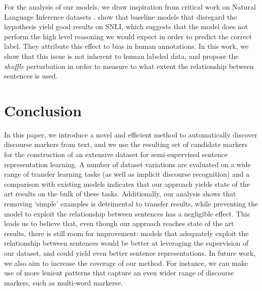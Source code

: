 \documentclass[11pt,a4paper]{article}
\begin{document}
For the analysis of our models, we draw inspiration from critical work on Natural Language Inference datasets \citep{Dasgupta2018, Levy2018}.  
\citet{Gururangan2018,Poliak2018} show that baseline models that disregard the hypothesis yield good results on SNLI, which suggests that the model does not perform the high level reasoning we would expect in order to predict the correct label. They attribute this effect to bias in human annotations. In this work, we show that this issue is not inherent to human labeled data, and propose the \textit{shuffle} perturbation in order to measure to what extent the relationship between sentences is used.


\section{Conclusion}
In this paper, we introduce a novel and efficient method to automatically discover discourse markers from text, and we use the resulting set of candidate markers for the construction of an extensive dataset for semi-supervised sentence representation learning. A number of dataset variations are evaluated on a wide range of transfer learning tasks (as well as implicit discourse recognition) and a comparison with existing models indicates that our approach yields state of the art results on the bulk of these tasks. Additionally, our analysis shows that removing `simple' examples is detrimental to transfer results, while preventing the model to exploit the relationship between sentences has a negligible effect. This leads us to believe that, even though our approach reaches state of the art results, there is still room for improvement: models that adequately exploit the relationship between sentences would be better at leveraging the supervision of our dataset, and could yield even better sentence representations.
In future work, we also aim to increase the coverage of our method. For instance, we can make use of more lenient patterns that capture an even wider range of discourse markers, such as multi-word markerse. 









\end{document}
